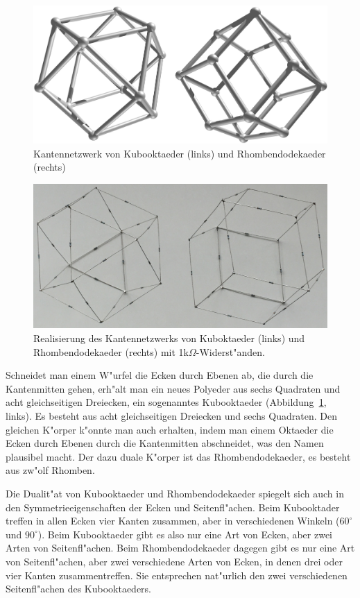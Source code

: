 \documentclass[a4paper,12pt]{article}
\begin{document}
\begin{figure}
\centering
\includegraphics[width=\hsize]{kubooktaeder.jpg}
\caption{Kantennetzwerk von Kubooktaeder (links) und Rhombendodekaeder (rechts)
\label{kantennetzwerke}}
\end{figure}
\begin{figure}
\centering
\includegraphics[width=\hsize]{realization.jpg}
\caption{Realisierung des Kantennetzwerks von Kuboktaeder (links)
und Rhombendodekaeder (rechts) mit 1k$\Omega$-Widerst"anden.
\label{realization}}
\end{figure}
Schneidet man einem W"urfel die Ecken durch Ebenen ab, die durch die
Kantenmitten gehen, erh"alt man ein neues Polyeder aus sechs Quadraten
und acht gleichseitigen Dreiecken, ein sogenanntes Kubooktaeder
(Abbildung~\ref{kantennetzwerke}, links).
Es besteht aus acht gleichseitigen Dreiecken und sechs Quadraten.
Den gleichen K"orper k"onnte man auch erhalten, indem man einem Oktaeder
die Ecken durch Ebenen durch die Kantenmitten abschneidet,
was den Namen plausibel macht.
Der dazu duale K"orper ist das Rhombendodekaeder, es besteht aus zw"olf Rhomben.

Die Dualit"at von Kubooktaeder und Rhombendodekaeder spiegelt sich auch in
den Symmetrieeigenschaften der Ecken und Seitenfl"achen.
Beim Kubooktader treffen in allen Ecken vier Kanten zusammen, aber in
verschiedenen Winkeln ($60^\circ$ und $90^\circ$).
Beim Kubooktaeder gibt es also nur eine Art von Ecken, aber zwei Arten von
Seitenfl"achen.
Beim Rhombendodekaeder dagegen gibt es nur eine Art von Seitenfl"achen,
aber zwei verschiedene Arten von Ecken, in denen drei oder vier
Kanten zusammentreffen.
Sie entsprechen nat"urlich den zwei verschiedenen Seitenfl"achen des 
Kubooktaeders.
\end{document}
